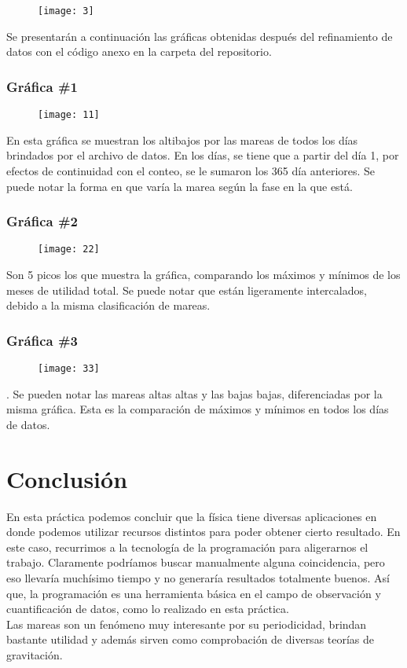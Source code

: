 \documentclass[a4paper]{article}
\begin{document}
\begin{figure}[H]
    \centering
    \texttt{[image: 3]}
  \end{figure} 
  
Se presentarán a continuación las gráficas obtenidas después del refinamiento de datos con el código anexo en la carpeta del repositorio.

\subsubsection{Gráfica \#1}
\begin{figure}[H]
    \centering
    \texttt{[image: 11]} \\
  \end{figure} 
En esta gráfica se muestran los altibajos por las mareas de todos los días brindados por el archivo de datos. En los días, se tiene que a partir del día 1, por efectos de continuidad con el conteo, se le sumaron los 365 día anteriores. Se puede notar la forma en que varía la marea según la fase en la que está.

\subsubsection{Gráfica \#2}
\begin{figure}[H]
    \centering
    \texttt{[image: 22]} \\
  \end{figure} 
Son 5 picos los que muestra la gráfica, comparando los máximos y mínimos de los meses de utilidad total. Se puede notar que están ligeramente intercalados, debido a la misma clasificación de mareas.

\subsubsection{Gráfica \#3}
\begin{figure}[H]
    \centering
    \texttt{[image: 33]} \\
  \end{figure} .
Se pueden notar las mareas altas altas y las bajas bajas, diferenciadas por la misma gráfica. Esta es la comparación de máximos y mínimos en todos los días de datos.

\section{Conclusión}
En esta práctica podemos concluir que la física tiene diversas aplicaciones en donde podemos utilizar recursos distintos para poder obtener cierto resultado. En este caso, recurrimos a la tecnología de la programación para aligerarnos el trabajo. Claramente podríamos buscar manualmente alguna coincidencia, pero eso llevaría muchísimo tiempo y no generaría resultados totalmente buenos. Así que, la programación es una herramienta básica en el campo de observación y cuantificación de datos, como lo realizado en esta práctica. \\

Las mareas son un fenómeno muy interesante por su periodicidad, brindan bastante utilidad y además sirven como comprobación de diversas teorías de gravitación.
\end{document}

